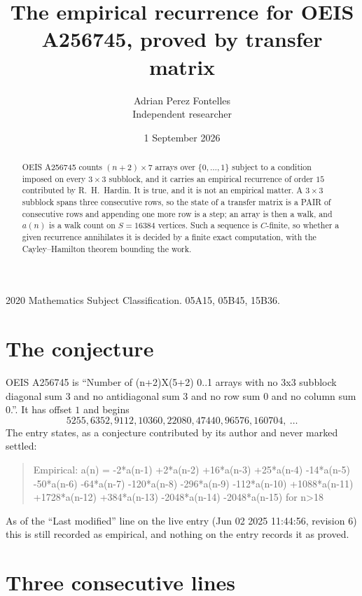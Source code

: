\documentclass[11pt,a4paper]{article}
\title{The empirical recurrence for OEIS A256745, proved by transfer matrix}
\author{Adrian Perez Fontelles\\ \small Independent researcher}
\date{1 September 2026}
\theoremstyle{plain}
\theoremstyle{definition}
\begin{document}
\maketitle

\begin{abstract}
OEIS A256745 counts $(n+2)\times7$ arrays over $\{0,\dots,1\}$ subject to a condition imposed on
every $3\times3$ subblock, and it carries an empirical recurrence of order $15$
contributed by R.~H.~Hardin. It is true, and it is not an empirical matter. A $3\times3$
subblock spans three consecutive rows, so the state of a transfer matrix is a PAIR of
consecutive rows and appending one more row is a step; an array is then a walk, and
$a(n)$ is a walk count on $S=16384$ vertices. Such a sequence is $C$-finite, so whether a given
recurrence annihilates it is decided by a finite exact computation, with the Cayley--Hamilton
theorem bounding the work.
\end{abstract}

\noindent\small 2020 Mathematics Subject Classification. 05A15, 05B45, 15B36.\normalsize

\section{The conjecture}

OEIS A256745 is ``Number of (n+2)X(5+2) 0..1 arrays with no 3x3 subblock diagonal sum 3 and no antidiagonal sum 3 and no row sum 0 and no column sum 0.''. It has offset $1$ and begins
\[
5255, 6352, 9112, 10360, 22080, 47440, 96576, 160704,\ \dots
\]
The entry states, as a conjecture contributed by its author and never marked settled:
\begin{quote}
Empirical: a(n) = -2*a(n-1) +2*a(n-2) +16*a(n-3) +25*a(n-4) -14*a(n-5) -50*a(n-6) -64*a(n-7) -120*a(n-8) -296*a(n-9) -112*a(n-10) +1088*a(n-11) +1728*a(n-12) +384*a(n-13) -2048*a(n-14) -2048*a(n-15) for n>18
\end{quote}
As of the ``Last modified'' line on the live entry (Jun 02 2025 11:44:56, revision 6) this is still
recorded as empirical, and nothing on the entry records it as proved.

\section{Three consecutive lines}
\end{document}
